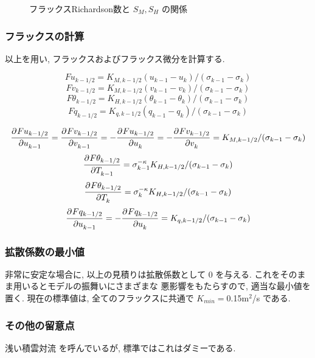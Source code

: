 \begin{figure}[htbp]
  \begin{center}
    \caption{フラックスRichardson数と $S_M,S_H$ の関係}
    \label{p-dif:smsh-rif}
  \end{center}
\end{figure}


\subsubsection{フラックスの計算}

以上を用い, フラックスおよびフラックス微分を計算する.

\begin{equation}
  Fu_{k-1/2} = K_{M,k-1/2}(u_{k-1}-u_{k})/(\sigma_{k-1}-\sigma_{k})
\end{equation}
\begin{equation}
  Fv_{k-1/2} = K_{M,k-1/2}(v_{k-1}-v_{k})/(\sigma_{k-1}-\sigma_{k})
\end{equation}
\begin{equation}
  F\theta_{k-1/2} 
  = K_{H,k-1/2}(\theta_{k-1}-\theta_{k})/(\sigma_{k-1}-\sigma_{k})
\end{equation}
\begin{equation}
  Fq_{k-1/2} = K_{q,k-1/2}(q_{k-1}-q_{k})/(\sigma_{k-1}-\sigma_{k})
\end{equation}

\begin{equation}
     \DP{Fu_{k-1/2}}{u_{k-1}} =   \DP{Fv_{k-1/2}}{v_{k-1}} 
  = -\DP{Fu_{k-1/2}}{u_{k}} = - \DP{Fv_{k-1/2}}{v_{k}}  
  = K_{M,k-1/2}/(\sigma_{k-1}-\sigma_{k})
\end{equation}
\begin{equation}
  \DP{F\theta_{k-1/2}}{T_{k-1}}
  = \sigma_{k-1}^{-\kappa} K_{H,k-1/2}/(\sigma_{k-1}-\sigma_{k})
\end{equation}
\begin{equation}
  \DP{F\theta_{k-1/2}}{T_{k}}
 = \sigma_{k}^{-\kappa} K_{H,k-1/2}/(\sigma_{k-1}-\sigma_{k})
\end{equation}
\begin{equation}
  \DP{Fq_{k-1/2}}{u_{k-1}}
 = - \DP{Fq_{k-1/2}}{u_{k}}
 = K_{q,k-1/2}/(\sigma_{k-1}-\sigma_{k})
\end{equation}

\subsubsection{拡散係数の最小値}

非常に安定な場合に, 以上の見積りは拡散係数として 0 を与える.
これをそのまま用いるとモデルの振舞いにさまざまな
悪影響をもたらすので, 適当な最小値を置く.
現在の標準値は, 全てのフラックスに共通で
$K_{min}=$0.15m$^{2}$/s である.

\subsubsection{その他の留意点}

浅い積雲対流  を呼んでいるが, 
標準ではこれはダミーである.
